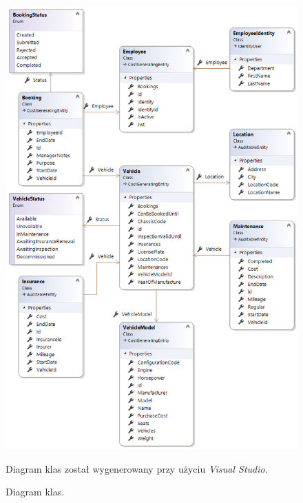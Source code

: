 \documentclass[eng,printmode,openany]{mgr}
\begin{document}
	\begin{figure}[H]
		\centering
		\includegraphics[width=\textwidth]{images/vs_class_diagram.png}
		\caption{Diagram klas.}
		\small 
		Diagram klas został wygenerowany przy użyciu \textit{Visual Studio}.
	\end{figure}
	
\end{document}
